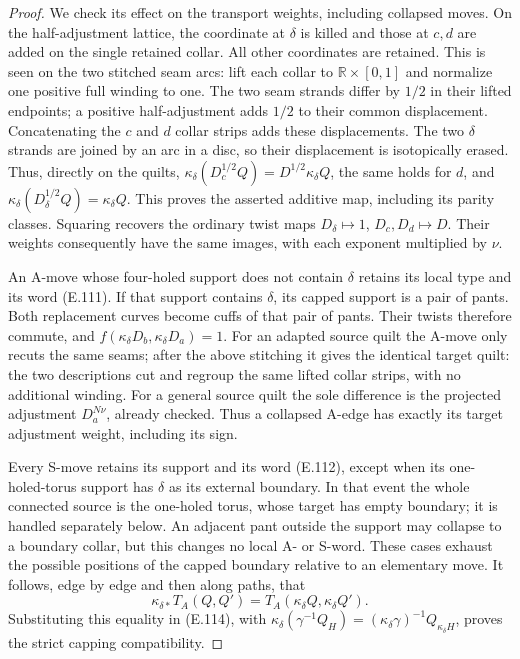 \begin{proof}
We check its effect on the transport
weights, including collapsed moves.
On the half-adjustment lattice,
the coordinate at $\delta$ is killed
and those at $c,d$ are added on the
single retained collar.  All other
coordinates are retained.  This is
seen on the two stitched seam arcs:
lift each collar to
$\mathbb R\times[0,1]$ and normalize
one positive full winding to one.
The two seam strands differ by
$1/2$ in their lifted endpoints;
a positive half-adjustment adds
$1/2$ to their common displacement.
Concatenating the $c$ and $d$
collar strips adds these
displacements.  The two $\delta$
strands are joined by an arc in
a disc, so their displacement
is isotopically erased.  Thus,
directly on the quilts,
$\kappa_\delta(D_c^{1/2}Q)
=D^{1/2}\kappa_\delta Q$,
the same holds for $d$, and
$\kappa_\delta(D_\delta^{1/2}Q)
=\kappa_\delta Q$.
This proves the asserted additive
map, including its parity classes.
Squaring recovers the ordinary
twist maps
$D_\delta\mapsto1$, $D_c,D_d\mapsto D$.
Their weights consequently have
the same images, with each exponent
multiplied by $\nu$.

An A-move whose four-holed support
does not contain $\delta$ retains
its local type and its word (E.111).
If that support contains $\delta$,
its capped support is a pair of
pants.  Both replacement curves
become cuffs of that pair of pants.
Their twists therefore commute,
and
$f(\kappa_\delta D_b,\kappa_\delta D_a)=1$.
For an adapted source quilt the
A-move only recuts the same seams;
after the above stitching it gives
the identical target quilt: the
two descriptions cut and regroup
the same lifted collar strips,
with no additional winding.
For a general source quilt the
sole difference is the projected
adjustment $D_a^{N\nu}$, already
checked.  Thus a collapsed A-edge
has exactly its target adjustment
weight, including its sign.

Every S-move retains its support
and its word (E.112), except when
its one-holed-torus support has
$\delta$ as its external boundary.
In that event the whole connected
source is the one-holed torus,
whose target has empty boundary;
it is handled separately below.
An adjacent pant outside the support
may collapse to a boundary collar,
but this changes no local A- or
S-word.  These cases exhaust the
possible positions of the capped
boundary relative to an elementary
move.  It follows, edge by edge
and then along paths, that
\[
 \kappa_{\delta *}T_A(Q,Q')
     =T_A(\kappa_\delta Q,\kappa_\delta Q').             \tag{E.131}
\]
Substituting this equality in
(E.114), with
$\kappa_\delta(\gamma^{-1}Q_H)
=(\kappa_\delta\gamma)^{-1}
   Q_{\kappa_\delta H}$, proves the
strict capping compatibility.


\end{proof}
